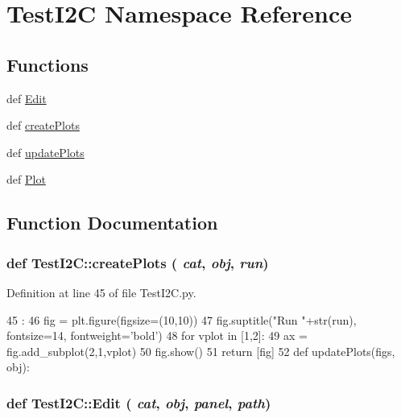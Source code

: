 \hypertarget{namespaceTestI2C}{
\section{TestI2C Namespace Reference}
\label{namespaceTestI2C}
}
\subsection*{Functions}
\begin{DoxyCompactItemize}
\item 
def \hyperlink{namespaceTestI2C_a45a76dbac47e88483800944e5836ee4f}{Edit}
\item 
def \hyperlink{namespaceTestI2C_a8fac05147a58a9ee35f4940b5e133282}{createPlots}
\item 
def \hyperlink{namespaceTestI2C_af22676a658c78e7fbea927dfef0a27ae}{updatePlots}
\item 
def \hyperlink{namespaceTestI2C_afd6c6404fd8a975cb2252702f97f4b6b}{Plot}
\end{DoxyCompactItemize}


\subsection{Function Documentation}
\hypertarget{namespaceTestI2C_a8fac05147a58a9ee35f4940b5e133282}{
\subsubsection[{createPlots}]{\setlength{\rightskip}{0pt plus 5cm}def TestI2C::createPlots ( {\em cat}, \/   {\em obj}, \/   {\em run})}}
\label{namespaceTestI2C_a8fac05147a58a9ee35f4940b5e133282}


Definition at line 45 of file TestI2C.py.


\begin{DoxyCode}
45                               :
46     fig = plt.figure(figsize=(10,10))
47     fig.suptitle("Run "+str(run), fontsize=14, fontweight='bold')
48     for vplot in [1,2]:
49         ax = fig.add_subplot(2,1,vplot)
50     fig.show()    
51     return [fig]
52 
def updatePlots(figs, obj):
\end{DoxyCode}
\hypertarget{namespaceTestI2C_a45a76dbac47e88483800944e5836ee4f}{
\subsubsection[{Edit}]{\setlength{\rightskip}{0pt plus 5cm}def TestI2C::Edit ( {\em cat}, \/   {\em obj}, \/   {\em panel}, \/   {\em path})}}
\label{namespaceTestI2C_a45a76dbac47e88483800944e5836ee4f}


